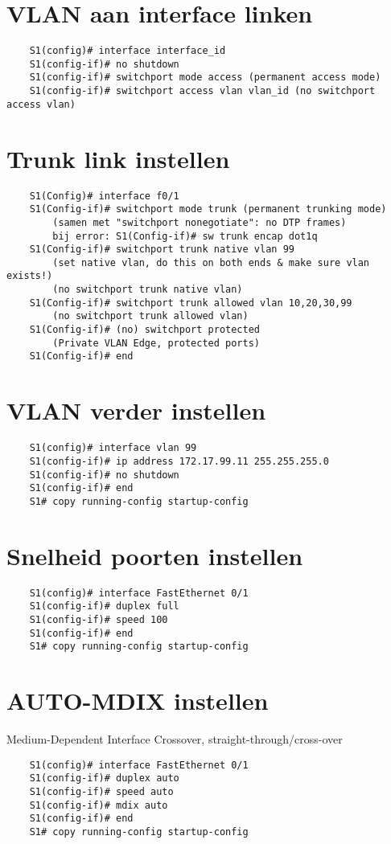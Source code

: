 \documentclass[10pt, a4paper]{article}
\begin{document}
	\section{VLAN aan interface linken}
	\begin{lstlisting}
	S1(config)# interface interface_id
	S1(config-if)# no shutdown
	S1(config-if)# switchport mode access (permanent access mode)
	S1(config-if)# switchport access vlan vlan_id (no switchport access vlan)
	\end{lstlisting}
	
	\section{Trunk link instellen}
	\begin{lstlisting}
	S1(Config)# interface f0/1
	S1(Config-if)# switchport mode trunk (permanent trunking mode) 
		(samen met "switchport nonegotiate": no DTP frames)
		bij error: S1(Config-if)# sw trunk encap dot1q
	S1(Config-if)# switchport trunk native vlan 99 
		(set native vlan, do this on both ends & make sure vlan exists!) 
		(no switchport trunk native vlan)
	S1(Config-if)# switchport trunk allowed vlan 10,20,30,99 
		(no switchport trunk allowed vlan)
	S1(Config-if)# (no) switchport protected 
		(Private VLAN Edge, protected ports)
	S1(Config-if)# end
	\end{lstlisting}
	
	\section{VLAN verder instellen}
	\begin{lstlisting}
	S1(config)# interface vlan 99
	S1(config-if)# ip address 172.17.99.11 255.255.255.0
	S1(config-if)# no shutdown
	S1(config-if)# end
	S1# copy running-config startup-config
	\end{lstlisting}
	
	\section{Snelheid poorten instellen}
	\begin{lstlisting}
	S1(config)# interface FastEthernet 0/1
	S1(config-if)# duplex full
	S1(config-if)# speed 100
	S1(config-if)# end
	S1# copy running-config startup-config
	\end{lstlisting}
	
	\section{AUTO-MDIX instellen}
	Medium-Dependent Interface Crossover, straight-through/cross-over\\
	\begin{lstlisting}
	S1(config)# interface FastEthernet 0/1
	S1(config-if)# duplex auto
	S1(config-if)# speed auto
	S1(config-if)# mdix auto
	S1(config-if)# end
	S1# copy running-config startup-config
	\end{lstlisting}
	
\end{document}
